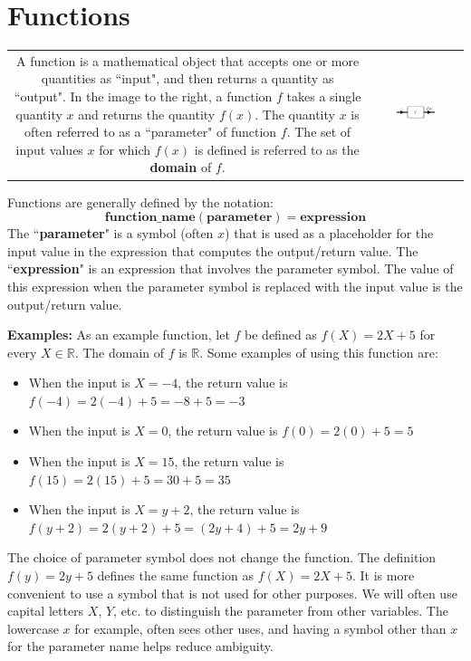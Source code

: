 \documentclass{article}
\begin{document}
\section{Functions}

\begin{tabular}{cc}
\parbox{0.5\textwidth}{
A function is a mathematical object that accepts one or more quantities as ``input", and then returns a quantity as ``output". In the image to the right, a function \(f\) takes a single quantity \(x\) and returns the quantity \(f(x)\). The quantity \(x\) is often referred to as a ``parameter" of function \(f\). The set of input values \(x\) for which \(f(x)\) is defined is referred to as the {\bf domain} of \(f\). 
} & \parbox{0.5\textwidth}{
\includegraphics[width = 0.5\textwidth]{function_box}
}
\end{tabular}
Functions are generally defined by the notation:
\[\textbf{function\_name}(\textbf{parameter}) = \textbf{expression}\]
The ``\textbf{parameter}" is a symbol (often \(x\)) that is used as a placeholder for the input value in the expression that computes the output/return value. The ``\textbf{expression}" is an expression that involves the parameter symbol. The value of this expression when the parameter symbol is replaced with the input value is the output/return value.

\textbf{Examples:}
As an example function, let \(f\) be defined as \(f(X) = 2X+ 5\) for every \(X \in \mathbb{R}\). The domain of \(f\) is \(\mathbb{R}\). Some examples of using this function are:
\begin{itemize}
\item When the input is \(X = -4\), the return value is \(f(-4) = 2(-4) + 5 = -8 + 5 = -3\)
\item When the input is \(X = 0\), the return value is \(f(0) = 2(0) + 5 = 5\)
\item When the input is \(X = 15\), the return value is \(f(15) = 2(15) + 5 = 30 + 5 = 35\)
\item When the input is \(X = y + 2\), the return value is \(f(y + 2) = 2(y + 2) + 5 = (2y + 4) + 5 = 2y + 9\)
\end{itemize}

The choice of parameter symbol does not change the function. The definition \(f(y) = 2y + 5\) defines the same function as \(f(X) = 2X + 5\). It is more convenient to use a symbol that is not used for other purposes. We will often use capital letters \(X\), \(Y\), etc. to distinguish the parameter from other variables. The lowercase \(x\) for example, often sees other uses, and having a symbol other than \(x\) for the parameter name helps reduce ambiguity.
\end{document}
